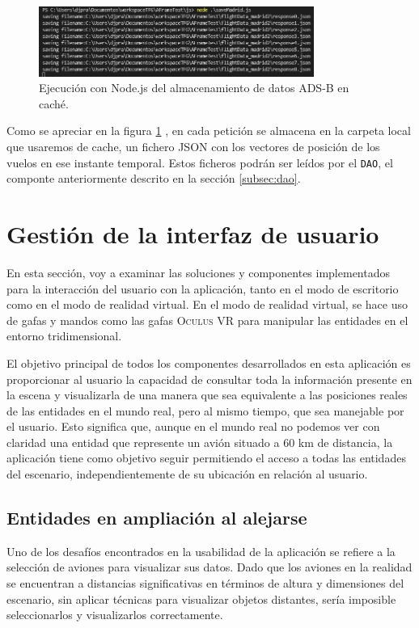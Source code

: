 \documentclass[a4paper, 11pt]{book}
\begin{document}
\begin{figure}[h]
  \centering
  \includegraphics[width=9cm, keepaspectratio]{img/captura_datos_madrid.jpg}
  \caption{Ejecución con Node.js del almacenamiento de datos ADS-B en caché.}
  \label{fig:capturaDatosCache}
\end{figure}

Como se apreciar en la figura \ref{fig:capturaDatosCache} , en cada petición se almacena en la carpeta local que usaremos de cache, un fichero \textsc{\gls{JSON}} con los vectores de posición de los vuelos en ese instante temporal.
Estos ficheros podrán ser leídos por el \texttt{DAO}, el componte anteriormente descrito en la sección \ref{subsec:dao}.
\clearpage
\section{Gestión de la interfaz de usuario}
\label{sec:gui}
En esta sección, voy a examinar las soluciones y componentes implementados para la interacción del usuario con la aplicación, tanto en el modo de escritorio como en el modo de realidad virtual. En el modo de realidad virtual, se hace uso de gafas y mandos como las gafas \textsc{Oculus VR} para manipular las entidades en el entorno tridimensional.

El objetivo principal de todos los componentes desarrollados en esta aplicación es proporcionar al usuario la capacidad de consultar toda la información presente en la escena y visualizarla de una manera que sea equivalente a las posiciones reales de las entidades en el mundo real, pero al mismo tiempo, que sea manejable por el usuario. Esto significa que, aunque en el mundo real no podemos ver con claridad una entidad que represente un avión situado a 60 km de distancia, la aplicación tiene como objetivo seguir permitiendo el acceso a todas las entidades del escenario, independientemente de su ubicación en relación al usuario.
\subsection{Entidades en ampliación al alejarse}
\label{subsec:hover-scale}
Uno de los desafíos encontrados en la usabilidad de la aplicación se refiere a la selección de aviones para visualizar sus datos. Dado que los aviones en la realidad se encuentran a distancias significativas en términos de altura y dimensiones del escenario, sin aplicar técnicas para visualizar objetos distantes, sería imposible seleccionarlos y visualizarlos correctamente.
\end{document}
